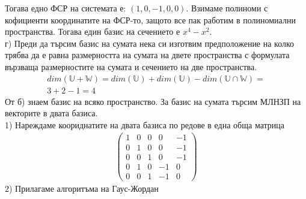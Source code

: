 \documentclass[a4paper, 12pt, oneside]{article}
\begin{document}
Тогава едно ФСР на системата е: \((1, 0, -1, 0, 0)\).
Взимаме полиноми с кофициенти координатите на ФСР-то, защото все пак работим в полиномиални пространства.
Тогава един базис на сечението е \(x^4 - x^2\). \\
г) Преди да търсим базис на сумата нека си изготвим предположение на колко трябва да е равна размерността
на сумата на двете пространства с формулата вързваща размерностите на сумата и сечението на две пространства.
\begin{align*}
    dim(\mathbb{U} + \mathbb{W}) = dim(\mathbb{U}) + dim(\mathbb{U}) - dim(\mathbb{U} \cap \mathbb{W}) = \\
    3 + 2 - 1 = 4
\end{align*}
От б) знаем базис на всяко пространство. За базис на сумата търсим МЛНЗП на векторите в двата базиса. \\
1) Нареждаме коориднатите на двата базиса по редове в една обща матрица
\begin{align*}
    \begin{pmatrix}
        1 & 0 & 0 & 0 & -1 \\
        0 & 1 & 0 & 0 & -1 \\
        0 & 0 & 1 & 0 & -1 \\
        0 & 1 & 0 & -1 & 0 \\
        0 & 0 & 1 & -1 & 0
    \end{pmatrix}
\end{align*}
2) Прилагаме алгоритъма на Гаус-Жордан
\end{document}
